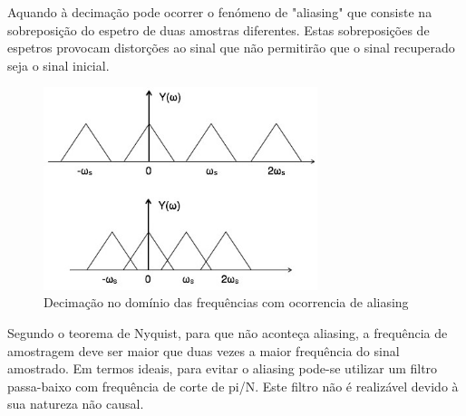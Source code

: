 \documentclass[11pt]{article}
\begin{document}
Aquando à decimação pode ocorrer o fenómeno de "aliasing" que consiste na sobreposição do espetro de duas amostras diferentes. Estas sobreposições de espetros provocam distorções ao sinal que não permitirão que o sinal recuperado seja o sinal inicial.
\begin{figure}[h]
\begin{center}
\includegraphics[width=8cm]{aliasing1.jpg}
\caption{Decimação no domínio das frequências com ocorrencia de aliasing}
\label{figura5}
\end{center}
\end{figure}

Segundo o teorema de Nyquist, para que não aconteça aliasing, a frequência de amostragem deve ser maior que duas vezes a maior frequência do sinal amostrado. Em termos ideais, para evitar o aliasing pode-se utilizar um filtro passa-baixo com frequência de corte de pi/N. Este filtro não é realizável devido à sua natureza não causal.
\newpage
\end{document}

